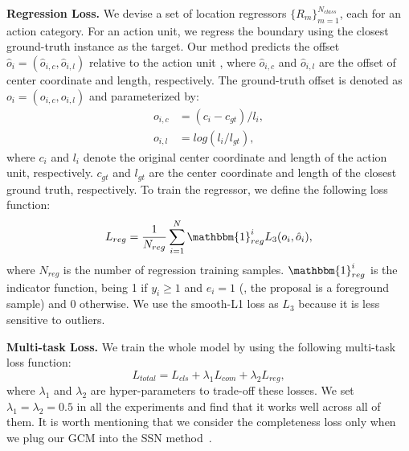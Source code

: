 \documentclass[10pt,journal,compsoc]{IEEEtran}
\begin{document}
	\noindent \textbf{Regression Loss.}
	We devise a set of location regressors $\{R_m\}_{m=1}^{N_{class}}$, each for an action category. For an action unit, we regress the boundary using the closest ground-truth instance as the target. Our method predicts the offset $\hat{o}_i=(\hat{o}_{i,c}, \hat{o}_{i,l})$ relative to the action unit , where $\hat{o}_{i,c}$ and $\hat{o}_{i,l}$ are the offset of center coordinate and length, respectively. The ground-truth offset is denoted as $o_i=(o_{i,c}, o_{i,l})$ and parameterized by:
	\begin{equation}
	\begin{aligned}
	o_{i,c}&=(c_i-c_{gt})/l_i, \\
	o_{i,l}&=log(l_i/l_{gt}), 
	\end{aligned}
	\end{equation}
	where $c_i$ and $l_i$ denote the original center coordinate and length of the action unit, respectively. $c_{gt}$ and $l_{gt}$ are the center coordinate and length of the closest ground truth, respectively. To train the regressor, we define the following loss function:
	\begin{equation}
	L_{reg}=\frac{1}{N_{reg}}\sum_{i=1}^{N} \mathbbm{1}_{reg}^i L_{3}(o_i, \hat{o}_i),
	\end{equation}
	where $N_{reg}$ is the number of regression training samples.
	$\mathbbm{1}_{reg}^i$ is the indicator function, being 1 if $y_i\ge1$ and $e_i=1$ (\ie, the proposal is a foreground sample) and 0 otherwise. We use the smooth-L1 loss as $L_{3}$ because it is less sensitive to outliers.
	
	\noindent \textbf{Multi-task Loss.} We train the whole model by using the following multi-task loss function:
	\begin{equation}\label{Eq:loss_total}
	L_{total}=L_{cls}+\lambda_{1}L_{com} +\lambda_{2}L_{reg},
	\end{equation}
	where $\lambda_{1}$ and $\lambda_{2}$ are hyper-parameters to trade-off these
	losses. We set $\lambda_{1}=\lambda_{2}=0.5$ in all the experiments and find that
	it works well across all of them. It is worth mentioning that we consider the completeness loss only when we plug our GCM into the SSN method~\cite{zhao2017temporal}.
	
\end{document}

